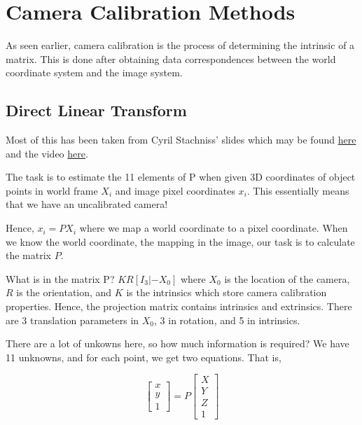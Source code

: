 \chapter{Camera Calibration Methods}

As seen earlier, camera calibration is the process of determining the intrinsic of a matrix. This is done after obtaining data correspondences between the world coordinate system and the image system.

\section{Direct Linear Transform}

Most of this has been taken from Cyril Stachniss' slides which may be found \href{https://github.com/RoboticsIIITH/summer-sessions-2020/blob/master/lecture-slides/Multiple\%20View\%20Geometry/lecture-2/pho1-16-DLT-calibration.pptx.pdf}{here} and the video \href{https://www.youtube.com/watch?v=3NcQbZu6xt8}{here}.

The task is to estimate the 11 elements of P when given 3D coordinates of object points in world frame $X_i$ and image pixel coordinates $x_i$. This essentially means that we have an uncalibrated camera!

Hence, $x_i = PX_i$ where we map a world coordinate to a pixel coordinate. When we know the world coordinate, the mapping in the image, our task is to calculate the matrix $P$. 

What is in the matrix P? $KR[I_3|-X_0]$ where $X_0$ is the location of the camera, $R$ is the orientation, and $K$ is the intrinsics which store camera calibration properties. Hence, the projection matrix contains intrinsics and extrinsics. There are 3 translation parameters in $X_0$, 3 in rotation, and 5 in intrinsics.

There are a lot of unkowns here, so how much information is required? We have 11 unknowns, and for each point, we get two equations. That is,

\begin{equation}
    \begin{bmatrix}
    x \\
    y\\
    1
    \end{bmatrix} = P\begin{bmatrix}
    X \\
    Y\\
    Z\\
    1
    \end{bmatrix}
\end{equation}

